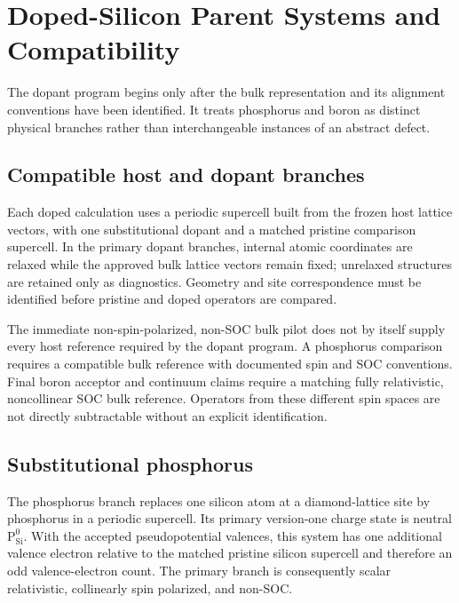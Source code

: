 \chapter{Doped-Silicon Parent Systems and Compatibility}

\label{ch:doped-silicon-program}


The dopant program begins only after the bulk representation and its alignment
conventions have been identified. It treats phosphorus and boron as distinct
physical branches rather than interchangeable instances of an abstract defect.

\section{Compatible host and dopant branches}


Each doped calculation uses a periodic supercell built from the frozen host
lattice vectors, with one substitutional dopant and a matched pristine
comparison supercell. In the primary dopant branches, internal atomic
coordinates are relaxed while the approved bulk lattice vectors remain fixed;
unrelaxed structures are retained only as diagnostics. Geometry and site
correspondence must be identified before pristine and doped operators are
compared.

The immediate non-spin-polarized, non-SOC bulk pilot does not by itself supply
every host reference required by the dopant program. A phosphorus comparison
requires a compatible bulk reference with documented spin and SOC conventions.
Final boron acceptor and continuum claims require a matching fully relativistic,
noncollinear SOC bulk reference. Operators from these different spin spaces are
not directly subtractable without an explicit identification.

\section{Substitutional phosphorus}


The phosphorus branch replaces one silicon atom at a diamond-lattice site by
phosphorus in a periodic supercell. Its primary version-one charge state is
neutral $\mathrm{P}_{\mathrm{Si}}^{0}$. With the accepted pseudopotential
valences, this system has one additional valence electron relative to the
matched pristine silicon supercell and therefore an odd valence-electron count.
The primary branch is consequently scalar relativistic, collinearly spin
polarized, and non-SOC.

